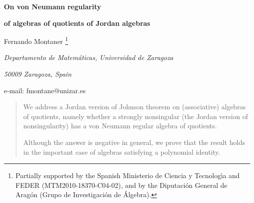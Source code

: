 \documentclass[a4paper,twoside,11pt]{article}
\theoremstyle{plain}
\theoremstyle{miestilo}
\theoremstyle{misnotas}
\begin{document}
\flushbottom


\def \C{\mathcal C}
\def \E{\mathcal E}
\def \Hom{{\rm Hom}}
\def \End{{\rm End}}
\def \boPHI{\mathbf{\Phi}}


%
%







{\Large  {\centerline {\bf On von Neumann regularity}}}
{\Large   {\centerline  {\bf of algebras of quotients of Jordan algebras} } }%

 \medskip

\centerline{ Fernando Montaner \footnote{Partially supported  by
the Spanish Ministerio de Ciencia y Tecnolog\'{\i}a and FEDER (MTM2010-18370-C04-02), and by the
Diputaci\'on General de Arag\'on (Grupo de Investigaci\'on de
\'Algebra).}} \centerline{{\sl Departamento de Matem\'{a}ticas,
Universidad de Zaragoza}} \centerline{{\sl 50009 Zaragoza,
Spain}} \centerline{e-mail: fmontane@unizar.es}

 \medskip


%
%
\begin{abstract}
We address a Jordan version of Johnson theorem on (associative) algebras of quotients, namely whether a strongly nonsingular (the Jordan version of nonsingularity) has a von Neumann regular algebra of quotients.

Although the answer is negative in general, we prove that the result holds in the important case of algebras satisfying a polynomial identity.

\end{abstract}
\end{document}
